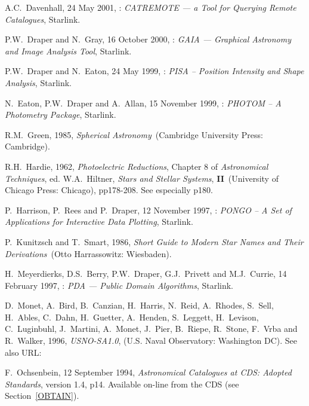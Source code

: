 \documentclass[twoside,11pt]{starlink}
\begin{document}
\begin{thebibliography}{99}
   A.C.~Davenhall, 24 May 2001,
   : \textit{CATREMOTE --- a Tool for Querying Remote
   Catalogues}, Starlink.

   P.W.~Draper and N.~Gray, 16 October 2000,
   : \textit{GAIA --- Graphical Astronomy and
   Image Analysis Tool}, Starlink.

   P.W.~Draper and N.~Eaton, 24 May 1999,
   : \textit{PISA -- Position Intensity and Shape
   Analysis}, Starlink.

   N.~Eaton, P.W.~Draper and A.~Allan, 15 November 1999,
   : \textit{PHOTOM -- A Photometry Package},
   Starlink.

   R.M.~Green, 1985, \textit{Spherical Astronomy}\,
   (Cambridge University Press: Cambridge).

   R.H.~Hardie, 1962, \textit{Photoelectric Reductions},
   Chapter 8 of \textit{Astronomical Techniques}, ed. W.A.~Hiltner, \textit{Stars and Stellar Systems}, \textbf{II}\, (University of Chicago Press:
   Chicago), pp178-208.  See especially p180.

   P.~Harrison, P.~Rees and P.~Draper, 12 November 1997,
   : \textit{PONGO -- A Set of Applications for
   Interactive Data Plotting}, Starlink.

   P.~Kunitzsch and T.~Smart, 1986, \textit{Short Guide to
   Modern Star Names and Their Derivations}\, (Otto Harrassowitz:
   Wiesbaden).

   H.~Meyerdierks, D.S.~Berry, P.W.~Draper, G.J.~Privett
   and M.J.~Currie, 14 February 1997, : \textit{PDA
   --- Public Domain Algorithms}, Starlink.

   D.~Monet, A.~Bird, B.~Canzian, H.~Harris, N.~Reid,
   A.~Rhodes, S.~Sell, H.~Ables, C.~Dahn, H.~Guetter, A.~Henden,
   S.~Leggett, H.~Levison, C.~Luginbuhl, J.~Martini, A.~Monet, J.~Pier,
   B.~Riepe, R.~Stone, F.~Vrba and R.~Walker,
   1996, \textit{USNO-SA1.0}, (U.S. Naval Observatory: Washington DC).
   See also URL: 

   F.~Ochsenbein, 12 September 1994, \textit{Astronomical Catalogues at CDS: Adopted Standards}, version 1.4, p14.
   Available on-line from the CDS (see Section~\ref{OBTAIN}).


\end{thebibliography}
\end{document}
